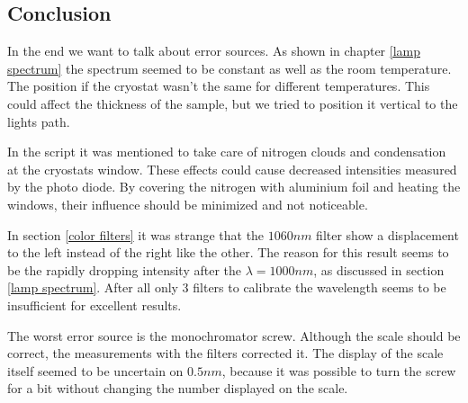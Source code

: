 \documentclass[]{article}
\begin{document}
\subsection{Conclusion} \label{Conclusion}
In the end we want to talk about error sources. As shown in chapter \ref{lamp spectrum} the spectrum seemed to be constant as well as the room temperature. The position if the cryostat wasn't the same for different temperatures. This could affect the thickness of the sample, but we tried to position it vertical to the lights path. 

In the script it was mentioned to take care of nitrogen clouds and condensation at the cryostats window. These effects could cause decreased intensities measured by the photo diode. By covering the nitrogen with aluminium foil and heating the windows, their influence should be minimized and not noticeable.

In section \ref{color filters} it was strange that the $1060nm$ filter show a displacement to the left instead of the right like the other. The reason for this result seems to be the rapidly dropping intensity after the $\lambda =1000nm$, as discussed in section \ref{lamp spectrum}. After all only 3 filters to calibrate the wavelength seems to be insufficient for excellent results.

The worst error source is the monochromator screw. Although the scale should be correct, the measurements with the filters corrected it. The display of the scale itself seemed to be uncertain on $0.5nm$, because it was possible to turn the screw for a bit without changing the number displayed on the scale. 


\newpage
\end{document}
